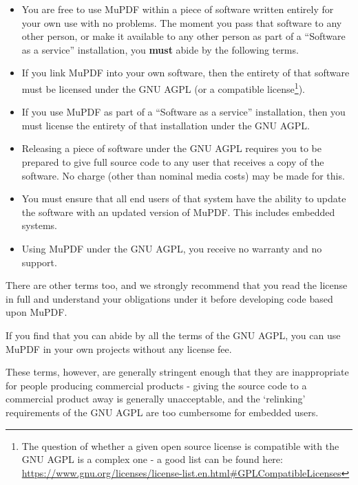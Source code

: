 \documentclass[oneside]{book}
\begin{document}
\begin{itemize}

\item
You are free to use MuPDF within a piece of software written entirely for your own use with no problems. The moment you pass that software to any other person, or make it available to any other person as part of a ``Software as a service'' installation, you \textbf{must} abide by the following terms.

\item
If you link MuPDF into your own software, then the entirety of that software must be licensed under the GNU AGPL (or a compatible license\footnote{The question of whether a given open source license is compatible with the GNU AGPL is a complex one - a good list can be found here: \url{https://www.gnu.org/licenses/license-list.en.html\#GPLCompatibleLicenses}}).

\item
If you use MuPDF as part of a ``Software as a service'' installation, then you must license the entirety of that installation under the GNU AGPL.

\item
Releasing a piece of software under the GNU AGPL requires you to be prepared to give full source code to any user that receives a copy of the software. No charge (other than nominal media costs) may be made for this.

\item
You must ensure that all end users of that system have the ability to update the software with an updated version of MuPDF. This includes embedded systems.

\item
Using MuPDF under the GNU AGPL, you receive no warranty and no support.

\end{itemize}

There are other terms too, and we strongly recommend that you read the license in full and understand your obligations under it before developing code based upon MuPDF.

If you find that you can abide by all the terms of the GNU AGPL, you can use MuPDF in your own projects without any license fee.

These terms, however,  are generally stringent enough that they are inappropriate for people producing commercial products - giving the source code to a commercial product away is generally unacceptable, and the `relinking' requirements of the GNU AGPL are too cumbersome for embedded users.
\end{document}
